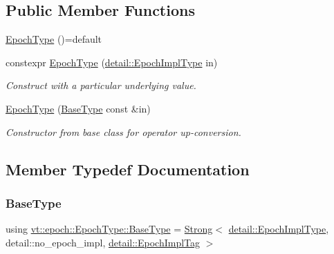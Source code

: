 \subsection*{Public Member Functions}
\begin{DoxyCompactItemize}
\item 
\hyperlink{structvt_1_1epoch_1_1_epoch_type_af81c3687330f393102a6a19d6e2e9068}{Epoch\+Type} ()=default
\item 
constexpr \hyperlink{structvt_1_1epoch_1_1_epoch_type_a5ea58f0e2482e379caad92069601a835}{Epoch\+Type} (\hyperlink{namespacevt_1_1epoch_1_1detail_a9adc5df96a521e516dc20511eb553075}{detail\+::\+Epoch\+Impl\+Type} in)
\begin{DoxyCompactList}\small\item\em Construct with a particular underlying value. \end{DoxyCompactList}\item 
\hyperlink{structvt_1_1epoch_1_1_epoch_type_a4f3880228864dd1abcd9d3ff16eb048d}{Epoch\+Type} (\hyperlink{structvt_1_1epoch_1_1_epoch_type_ae46db92b0cf02c6416ac26e8959947bf}{Base\+Type} const \&in)
\begin{DoxyCompactList}\small\item\em Constructor from base class for operator up-\/conversion. \end{DoxyCompactList}\end{DoxyCompactItemize}


\subsection{Member Typedef Documentation}
\mbox{\label{structvt_1_1epoch_1_1_epoch_type_ae46db92b0cf02c6416ac26e8959947bf}} 
\subsubsection{\texorpdfstring{Base\+Type}{BaseType}}
{\footnotesize\ttfamily using \hyperlink{structvt_1_1epoch_1_1_epoch_type_ae46db92b0cf02c6416ac26e8959947bf}{vt\+::epoch\+::\+Epoch\+Type\+::\+Base\+Type} =  \hyperlink{namespacevt_adbd3338278905742eb2de6db590fd2f1}{Strong}$<$ \hyperlink{namespacevt_1_1epoch_1_1detail_a9adc5df96a521e516dc20511eb553075}{detail\+::\+Epoch\+Impl\+Type}, detail\+::no\+\_\+epoch\+\_\+impl, \hyperlink{structvt_1_1epoch_1_1detail_1_1_epoch_impl_tag}{detail\+::\+Epoch\+Impl\+Tag} $>$}



